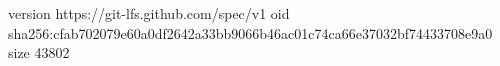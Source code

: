 version https://git-lfs.github.com/spec/v1
oid sha256:cfab702079e60a0df2642a33bb9066b46ac01c74ca66e37032bf74433708e9a0
size 43802

